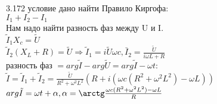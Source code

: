 \testCom
{%
	3.172
}
{%
	условие
}
{%
	дано
}
{%
	найти
}
{%
	Правило Киргофа:\\
	$I_1 + I_2 - I_1$\\
	Нам надо найти разность фаз между U и I.\\
	$\tilde I_1 X_c = \tilde U$\\
	$\tilde I_2 (X_L + R) = \tilde U \Rightarrow \tilde I_1 = i \tilde U \omega c, \bar I_2 =\frac{\tilde U}{i \omega L + R}$\\
	разность фаз $= arg \tilde I - arg \tilde U = arg \tilde I - \omega t:$\\
	$\tilde I = \tilde I_1 + \tilde I_2 = \frac{\tilde U}{R^2 + \omega^2 L^2} (R + i(\omega c (R^2 + \omega^2 L^2) - \omega L))$\\
	$arg \tilde I = \omega t + \alpha,\alpha = \arctg \frac{\omega c (R^2 + \omega^2 L^2) - \omega L}{R}$\\
}

